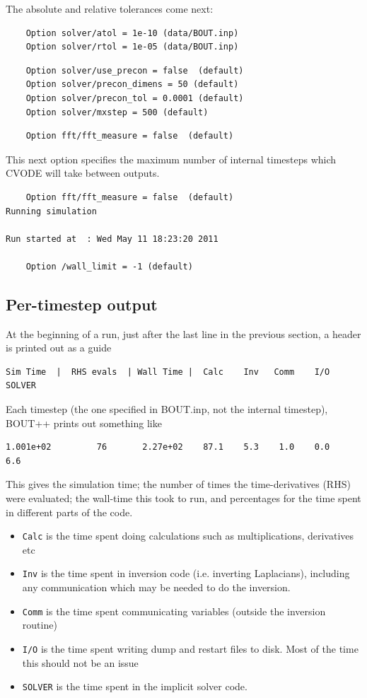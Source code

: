 \documentclass[12pt]{article}
\newcommand{\code}[1]{\texttt{#1}}
\begin{document}
The absolute and relative tolerances come next:
\begin{verbatim}
	Option solver/atol = 1e-10 (data/BOUT.inp)
	Option solver/rtol = 1e-05 (data/BOUT.inp)
\end{verbatim}

\begin{verbatim}
	Option solver/use_precon = false  (default)
	Option solver/precon_dimens = 50 (default)
	Option solver/precon_tol = 0.0001 (default)
	Option solver/mxstep = 500 (default)
\end{verbatim}


\begin{verbatim}
	Option fft/fft_measure = false  (default)
\end{verbatim}
This next option specifies the maximum number of internal timesteps which CVODE
will take between outputs.
\begin{verbatim}
	Option fft/fft_measure = false  (default)
Running simulation

Run started at  : Wed May 11 18:23:20 2011

	Option /wall_limit = -1 (default)
\end{verbatim}

\subsection{Per-timestep output}

At the beginning of a run, just after the last line in the previous section,
a header is printed out as a guide
\begin{verbatim}
Sim Time  |  RHS evals  | Wall Time |  Calc    Inv   Comm    I/O   SOLVER
\end{verbatim}

Each timestep (the one specified in BOUT.inp, not the internal timestep),
BOUT++ prints out something like
\begin{verbatim}
1.001e+02         76       2.27e+02    87.1    5.3    1.0    0.0    6.6
\end{verbatim}

This gives the simulation time; the number of times the time-derivatives (RHS) were evaluated;
the wall-time this took to run, and percentages for the time spent in different parts of the code.
\begin{itemize}
\item \code{Calc} is the time spent doing calculations such as multiplications, derivatives etc
\item \code{Inv} is the time spent in inversion code (i.e. inverting Laplacians), including any communication
which may be needed to do the inversion.
\item \code{Comm} is the time spent communicating variables (outside the inversion routine)
\item \code{I/O} is the time spent writing dump and restart files to disk. Most of the time this should not be an issue
\item \code{SOLVER} is the time spent in the implicit solver code.
\end{itemize}
\end{document}
